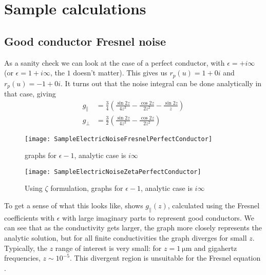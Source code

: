 \documentclass[../main.tex]{subfiles}
\begin{document}
	\section{Sample calculations} \label{sec:SampleCalcs}

	\subsection{Good conductor Fresnel noise} \label{subsec:sample:fresnelperfect}

	As a sanity check we can look at the case of a perfect conductor, with $\epsilon = + i \infty$ (or $\epsilon = 1 + i \infty$, the $1$ doesn't matter).
	This gives us $r_p(u) = 1 + 0 i$ and $r_p(u) = -1 + 0 i$.
	It turns out that the noise integral can be done analytically in that case, giving
	\begin{align}
		g_{\parallel} &= \frac{3}{4} \left(\frac{\sin{2 z}}{4 z^3} - \frac{\cos{2 z}}{2 z^2} - \frac{\sin{2 z}}{z}\right) \\
		g_{\perp} &= \frac32 \left( \frac{\sin{2 z}}{4 z^3} - \frac{\cos{2 z}}{2 z^2} \right)
	\end{align}

	\begin{figure}[htp]
		\centering
		\texttt{[image: SampleElectricNoiseFresnelPerfectConductor]}
		\caption{graphs for $\epsilon - 1$, analytic case is $i \infty$} \label{fig:SampleElectricNoiseFresnelPerfect}
	\end{figure}

	\begin{figure}[htp]
		\centering
		\texttt{[image: SampleElectricNoiseZetaPerfectConductor]}
		\caption{Using $\zeta$ formulation, graphs for $\epsilon - 1$, analytic case is $i \infty$} \label{fig:SampleElectricNoiseZetaPerfect}
	\end{figure}

	To get a sense of what this looks like,  shows $g_{\parallel}(z)$, calculated using the Fresnel coefficients with $\epsilon$ with large imaginary parts to represent good conductors.
	We can see that as the conductivity gets larger, the graph more closely represents the analytic solution, but for all finite conductivities the graph diverges for small $z$.
	Typically, the $z$ range of interest is very small: for $z = \SI{1}{\micro\meter}$ and gigahertz frequencies, $z \sim 10^{-5}$.
	This divergent region is unsuitable for the Fresnel equation .
\end{document}
